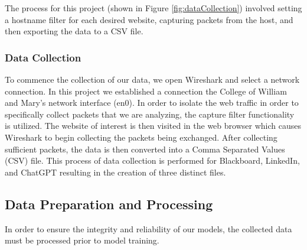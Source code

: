 \documentclass[10pt,sigconf,letterpaper,nonacm]{acmart}
\begin{document}
 The process for this project (shown in Figure \ref{fig:dataCollection}) involved setting a hostname filter for each desired website, capturing packets from the host, and then exporting the data to a CSV file.

 \subsubsection{Data Collection}
To commence the collection of our data, we open Wireshark and select a network connection. 
In this project we established a connection the College of William and Mary's network interface (en0). In order to isolate the web traffic in order to specifically collect 
packets that we are analyzing, the capture filter functionality is utilized. The website of interest is then visited in the web browser which causes Wireshark to begin collecting the packets being exchanged.
After collecting sufficient packets, the data is then converted into a Comma Separated Values (CSV) file. This process of data collection is performed for Blackboard, LinkedIn, and ChatGPT resulting in the creation of 
three distinct files. 

\subsection{Data Preparation and Processing}
In order to ensure the integrity and reliability of our models,
the collected data must be processed prior to model training.
\end{document}
